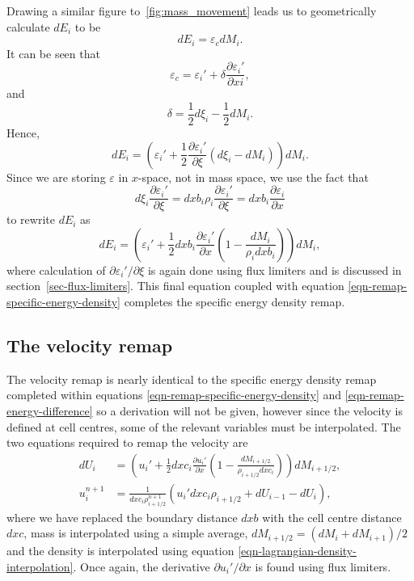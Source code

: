 Drawing a similar figure to~\ref{fig:mass_movement} leads us to geometrically calculate $dE_i$ to be
\begin{equation}
  dE_i = \varepsilon_c dM_i.
\end{equation}
It can be seen that
\begin{equation}
  \varepsilon_c = \varepsilon_i' + \delta \frac{\partial \varepsilon_i'}{\partial xi},
\end{equation}
and
\begin{equation}
  \delta = \frac{1}{2}d\xi_i - \frac{1}{2}dM_i.
\end{equation}
Hence, 
\begin{equation}
  dE_i = \left( \varepsilon_i' + \frac{1}{2}\frac{\partial \varepsilon_i'}{\partial \xi} (d\xi_i - dM_i) \right)dM_i.
\end{equation}
Since we are storing $\varepsilon$ in $x$-space, not in mass space, we use the fact that
\begin{equation}
  d\xi_i \frac{\partial \varepsilon_i'}{\partial \xi} = dxb_i\rho_i \frac{\partial \varepsilon_i'}{\partial \xi} = dxb_i \frac{\partial \varepsilon_i}{\partial x}
\end{equation}
to rewrite $dE_i$ as
\begin{equation}
  dE_i = \left( \varepsilon_i' + \frac{1}{2}dxb_i\frac{\partial \varepsilon_i'}{\partial x} \left( 1 - \frac{dM_i}{\rho_i dxb_i} \right) \right)dM_i,
  \label{eqn-remap-energy-difference}
\end{equation}
where calculation of $\partial \varepsilon_i'/\partial\xi$ is again done using flux limiters and is discussed in section~\ref{sec-flux-limiters}. This final equation coupled with equation \eqref{eqn-remap-specific-energy-density} completes the specific energy density remap.

\subsection{The velocity remap}
\label{sec-remap-velocity}
The velocity remap is nearly identical to the specific energy density remap completed within equations \eqref{eqn-remap-specific-energy-density} and \eqref{eqn-remap-energy-difference} so a derivation will not be given, however since the velocity is defined at cell centres, some of the relevant variables must be interpolated. The two equations required to remap the velocity are 
\begin{align}
  dU_i &= \left( u_i' + \frac{1}{2}dxc_i\frac{\partial u_i'}{\partial x} \left( 1 - \frac{dM_{i+1/2}}{\rho_{i+1/2} dxc_i} \right) \right)dM_{i+1/2},\\
  u_i^{n+1}  &= \frac{1}{dxc_i \rho_{i+1/2}^{n+1}}(u_i' dxc_i \rho_{i+1/2} + dU_{i-1} - dU_i),
\end{align}
where we have replaced the boundary distance $dxb$ with the cell centre distance $dxc$, mass is interpolated using a simple average, $dM_{i+1/2} = (dM_{i} + dM_{i+1})/2$ and the density is interpolated using equation \eqref{eqn-lagrangian-density-interpolation}. Once again, the derivative $\partial u_i' / \partial x$ is found using flux limiters. 

